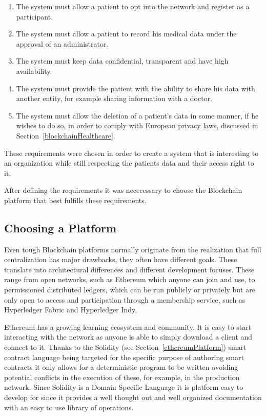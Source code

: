 \renewcommand{\labelenumi}{\Roman{enumi}.}
\begin{enumerate}
  \item The system must allow a patient to opt into the network and register as
    a participant.
  \item The system must allow a patient to record his medical data under the
    approval of an administrator.
  \item The system must keep data confidential, transparent and have
    high availability.
  \item The system must provide the patient with the ability to share his data
    with another entity, for example sharing information with a doctor.
  \item The system must allow the deletion of a patient's data in some manner,
    if he wishes to do so, in order to comply with European privacy laws,
    discussed in Section~\ref{blockchainHealthcare}.
\end{enumerate}

These requirements were chosen in order to create a system that is interesting
to an organization while still respecting the patients data and their access
right to it. 

After defining the requirements it was nececessary to choose the Blockchain
platform that best fulfills these requirements.

\subsection{Choosing a Platform}\label{choosePlatform}

Even tough Blockchain platforms normally originate from the realization that
full centralization has major drawbacks, they often have different goals. These
translate into architectural differences and different development focuses.
These range from open networks, such as Ethereum which anyone can join and use,
to permissioned distributed ledgers, which can be run publicly or privately but
are only open to access and participation through a membership service, such as
Hyperledger Fabric and Hyperledger Indy.

Ethereum has a growing learning ecosystem and community. It is easy to start
interacting with the network as anyone is able to simply download a client and
connect to it. Thanks to the Solidity (see Section~\ref{ethereumPlatform})
smart contract language being targeted for the specific purpose of authoring
smart contracts it only allows for a deterministic program to be written
avoiding potential conflicts in the execution of these, for example, in the
production network. Since Solidity is a Domain Specific Language it is platform
easy to develop for since it provides a well thought out and well organized
documentation with an easy to use library of operations.

